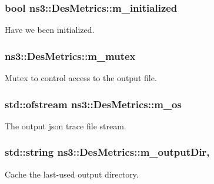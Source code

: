 \subsubsection[{\texorpdfstring{m\+\_\+initialized}{m_initialized}}]{\setlength{\rightskip}{0pt plus 5cm}bool ns3\+::\+Des\+Metrics\+::m\+\_\+initialized\hspace{0.3cm}{\ttfamily [private]}}\hypertarget{classns3_1_1DesMetrics_a229b920334708658e4d3b5ebf5e24c4c}{}\label{classns3_1_1DesMetrics_a229b920334708658e4d3b5ebf5e24c4c}


Have we been initialized. 

\subsubsection[{\texorpdfstring{m\+\_\+mutex}{m_mutex}}]{ ns3\+::\+Des\+Metrics\+::m\+\_\+mutex\hspace{0.3cm}{\ttfamily [private]}}\hypertarget{classns3_1_1DesMetrics_a05ad210056128f0154901516cbb884dc}{}\label{classns3_1_1DesMetrics_a05ad210056128f0154901516cbb884dc}
Mutex to control access to the output file. 
\subsubsection[{\texorpdfstring{m\+\_\+os}{m_os}}]{\setlength{\rightskip}{0pt plus 5cm}std\+::ofstream ns3\+::\+Des\+Metrics\+::m\+\_\+os\hspace{0.3cm}{\ttfamily [private]}}\hypertarget{classns3_1_1DesMetrics_ae84cea9d7b1c24d810e741bd8c46b430}{}\label{classns3_1_1DesMetrics_ae84cea9d7b1c24d810e741bd8c46b430}


The output json trace file stream. 

\subsubsection[{\texorpdfstring{m\+\_\+output\+Dir}{m_outputDir}}]{\setlength{\rightskip}{0pt plus 5cm}std\+::string ns3\+::\+Des\+Metrics\+::m\+\_\+output\+Dir\hspace{0.3cm}{\ttfamily [static]}, {\ttfamily [private]}}\hypertarget{classns3_1_1DesMetrics_affd6e3b6d411b401491d711506734d75}{}\label{classns3_1_1DesMetrics_affd6e3b6d411b401491d711506734d75}
Cache the last-\/used output directory.

